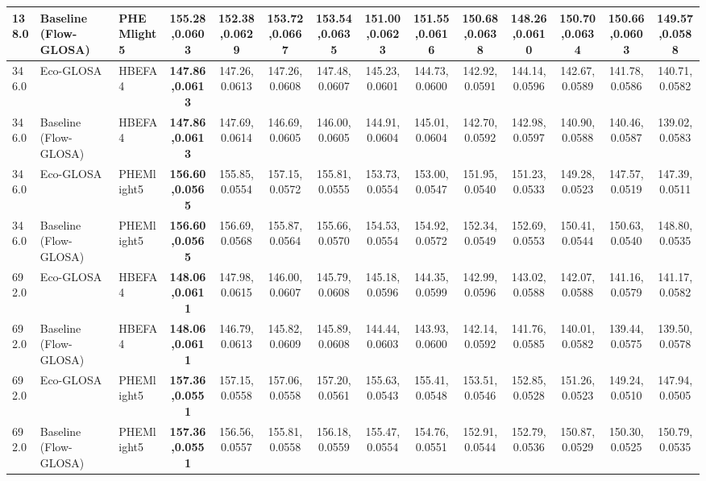 \begin{table}[htb]
{\begin{tabular}{l l l *{11}{c}}
      138.0 & Baseline (Flow-GLOSA)      & PHEMlight5   & \textbf{155.28,0.0603}   & 152.38,0.0629 & 153.72,0.0667 & 153.54,0.0635 & 151.00,0.0623 & 151.55,0.0616 & 150.68,0.0638 & 148.26,0.0610 & 150.70,0.0634 & 150.66,0.0603 & 149.57,0.0588 \\
      \midrule
      346.0 & Eco-GLOSA                  & HBEFA4       & \textbf{147.86,0.0613}   & 147.26,0.0613 & 147.26,0.0608 & 147.48,0.0607 & 145.23,0.0601 & 144.73,0.0600 & 142.92,0.0591 & 144.14,0.0596 & 142.67,0.0589 & 141.78,0.0586 & 140.71,0.0582 \\
      346.0 & Baseline (Flow-GLOSA)      & HBEFA4       & \textbf{147.86,0.0613}   & 147.69,0.0614 & 146.69,0.0605 & 146.00,0.0605 & 144.91,0.0604 & 145.01,0.0604 & 142.70,0.0592 & 142.98,0.0597 & 140.90,0.0588 & 140.46,0.0587 & 139.02,0.0583 \\
      346.0 & Eco-GLOSA                  & PHEMlight5   & \textbf{156.60,0.0565}   & 155.85,0.0554 & 157.15,0.0572 & 155.81,0.0555 & 153.73,0.0554 & 153.00,0.0547 & 151.95,0.0540 & 151.23,0.0533 & 149.28,0.0523 & 147.57,0.0519 & 147.39,0.0511 \\
      346.0 & Baseline (Flow-GLOSA)      & PHEMlight5   & \textbf{156.60,0.0565}   & 156.69,0.0568 & 155.87,0.0564 & 155.66,0.0570 & 154.53,0.0554 & 154.92,0.0572 & 152.34,0.0549 & 152.69,0.0553 & 150.41,0.0544 & 150.63,0.0540 & 148.80,0.0535 \\
      \midrule
      692.0 & Eco-GLOSA                  & HBEFA4       & \textbf{148.06,0.0611}   & 147.98,0.0615 & 146.00,0.0607 & 145.79,0.0608 & 145.18,0.0596 & 144.35,0.0599 & 142.99,0.0596 & 143.02,0.0588 & 142.07,0.0588 & 141.16,0.0579 & 141.17,0.0582 \\
      692.0 & Baseline (Flow-GLOSA)      & HBEFA4       & \textbf{148.06,0.0611}   & 146.79,0.0613 & 145.82,0.0609 & 145.89,0.0608 & 144.44,0.0603 & 143.93,0.0600 & 142.14,0.0592 & 141.76,0.0585 & 140.01,0.0582 & 139.44,0.0575 & 139.50,0.0578 \\
      692.0 & Eco-GLOSA                  & PHEMlight5   & \textbf{157.36,0.0551}   & 157.15,0.0558 & 157.06,0.0558 & 157.20,0.0561 & 155.63,0.0543 & 155.41,0.0548 & 153.51,0.0546 & 152.85,0.0528 & 151.26,0.0523 & 149.24,0.0510 & 147.94,0.0505 \\
      692.0 & Baseline (Flow-GLOSA)      & PHEMlight5   & \textbf{157.36,0.0551}   & 156.56,0.0557 & 155.81,0.0558 & 156.18,0.0559 & 155.47,0.0554 & 154.76,0.0551 & 152.91,0.0544 & 152.79,0.0536 & 150.87,0.0529 & 150.30,0.0525 & 150.79,0.0535 \\

\end{tabular}}
\end{table}
